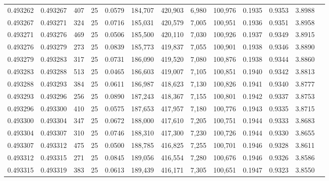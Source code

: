 \begin{tabular}{rrrrrrrrrrrrr}
0.493262 & 0.493267 &   407 &  25 &                                     0.0579 & 184,707 & 420,903 &   6,980 & 100,976 & 0.1935 & 0.9353 & 3.8988 \\
0.493267 & 0.493271 &   324 &  25 &                                     0.0716 & 185,031 & 420,579 &   7,005 & 100,951 & 0.1936 & 0.9351 & 3.8958 \\
0.493271 & 0.493276 &   469 &  25 &                                     0.0506 & 185,500 & 420,110 &   7,030 & 100,926 & 0.1937 & 0.9349 & 3.8915 \\
0.493276 & 0.493279 &   273 &  25 &                                     0.0839 & 185,773 & 419,837 &   7,055 & 100,901 & 0.1938 & 0.9346 & 3.8890 \\
0.493279 & 0.493283 &   317 &  25 &                                     0.0731 & 186,090 & 419,520 &   7,080 & 100,876 & 0.1938 & 0.9344 & 3.8860 \\
0.493283 & 0.493288 &   513 &  25 &                                     0.0465 & 186,603 & 419,007 &   7,105 & 100,851 & 0.1940 & 0.9342 & 3.8813 \\
0.493288 & 0.493293 &   384 &  25 &                                     0.0611 & 186,987 & 418,623 &   7,130 & 100,826 & 0.1941 & 0.9340 & 3.8777 \\
0.493293 & 0.493296 &   256 &  25 &                                     0.0890 & 187,243 & 418,367 &   7,155 & 100,801 & 0.1942 & 0.9337 & 3.8753 \\
0.493296 & 0.493300 &   410 &  25 &                                     0.0575 & 187,653 & 417,957 &   7,180 & 100,776 & 0.1943 & 0.9335 & 3.8715 \\
0.493300 & 0.493304 &   347 &  25 &                                     0.0672 & 188,000 & 417,610 &   7,205 & 100,751 & 0.1944 & 0.9333 & 3.8683 \\
0.493304 & 0.493307 &   310 &  25 &                                     0.0746 & 188,310 & 417,300 &   7,230 & 100,726 & 0.1944 & 0.9330 & 3.8655 \\
0.493307 & 0.493312 &   475 &  25 &                                     0.0500 & 188,785 & 416,825 &   7,255 & 100,701 & 0.1946 & 0.9328 & 3.8611 \\
0.493312 & 0.493315 &   271 &  25 &                                     0.0845 & 189,056 & 416,554 &   7,280 & 100,676 & 0.1946 & 0.9326 & 3.8586 \\
0.493315 & 0.493319 &   383 &  25 &                                     0.0613 & 189,439 & 416,171 &   7,305 & 100,651 & 0.1947 & 0.9323 & 3.8550 \\

\end{tabular}
